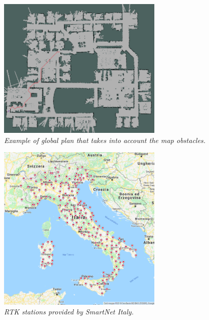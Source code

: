 \begin{figure}
	\centering
	\includegraphics[width=0.7\textwidth]{Images/localization/map_global_planner.png}
	\caption{\textit{Example of global plan that takes into account the map obstacles.}}
	\label{fig:mapGlobalPlanner}
\end{figure}

\begin{figure}
	\centering
	\includegraphics[width=0.7\textwidth]{Images/localization/rtkItaly.png}
	\caption{\textit{RTK stations provided by SmartNet Italy.}}
	\label{fig:rtkItaly}
\end{figure}

